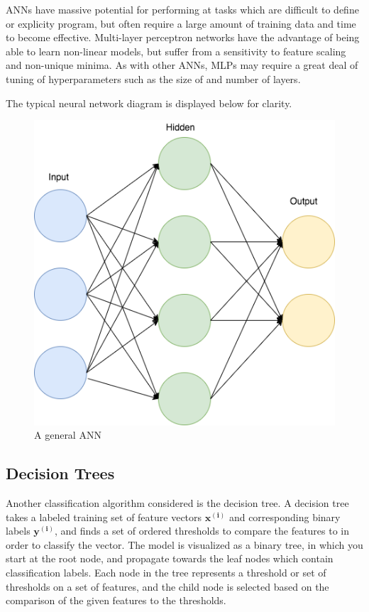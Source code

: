 ANNs have massive potential for performing at tasks which are difficult to define or explicity program, but often require a large amount of training data and time to become effective.
Multi-layer perceptron networks have the advantage of being able to learn non-linear models, but suffer from a sensitivity to feature scaling and non-unique minima.
As with other ANNs, MLPs may require a great deal of tuning of hyperparameters such as the size of and number of layers.

The typical neural network diagram is displayed below for clarity.

\begin{figure}[h]
\centering
\includegraphics[scale=.50]{figures/NN}
\caption{A general ANN}
\label{fig:tamu-fig3}
\end{figure}



\subsection{Decision Trees}

Another classification algorithm considered is the decision tree. 
A decision tree takes a labeled training set of feature vectors $\mathbf{x^{(i)}}$ and corresponding binary labels $\mathbf{y^{(i)}}$, and finds a set of ordered thresholds to compare the features to in order to classify the vector.
The model is visualized as a binary tree, in which you start at the root node, and propagate towards the leaf nodes which contain classification labels.
Each node in the tree represents a threshold or set of thresholds on a set of features, and the child node is selected based on the comparison of the given features to the thresholds.

